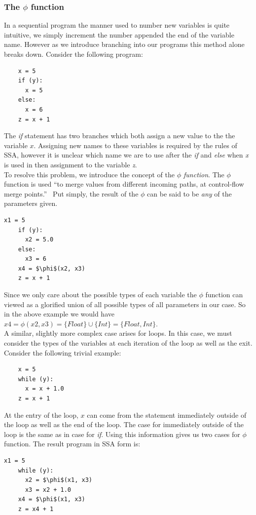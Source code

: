 \documentclass[12pt, titlepage]{article}
\begin{document}
\subsubsection{The $\phi$ function}
In a sequential program the manner used to number new variables is quite intuitive, we simply increment the number appended the end of the variable name. However as we introduce branching into our programs this method alone breaks down. Consider the following program:
\begin{lstlisting}
	x = 5
	if (y):
	  x = 5
	else:
	  x = 6
	z = x + 1
\end{lstlisting}
The \textit{if} statement has two branches which both assign a new value to the the variable $x$. Assigning new names to these variables is required by the rules of SSA, however it is unclear which name we are to use after the \textit{if} and \textit{else} when \textit{x} is used in then assignment to the variable \textit{z}. \\
To resolve this problem, we introduce the concept of the \emph{$\phi$ function}. The $\phi$ function is used ``to merge values from different incoming paths, at control-flow merge points.''~\cite{ssaBook} Put simply, the result of the $\phi$ can be said to be \emph{any} of the parameters given. 
\begin{lstlisting}[mathescape]
	x1 = 5
	if (y):
	  x2 = 5.0
	else:
	  x3 = 6
	x4 = $\phi$(x2, x3)
	z = x + 1
\end{lstlisting}
Since we only care about the possible types of each variable the $\phi$ function can viewed as a glorified union of all possible types of all parameters in our case. So in the above example we would have $x4 = \phi(x2, x3) = \{Float\} \cup \{Int\} = \{Float, Int\}$. \\
A similar, slightly more complex case arises for loops. In this case, we must consider the types of the variables at each iteration of the loop as well as the exit. Consider the following trivial example:
\begin{lstlisting}
	x = 5
	while (y):
	  x = x + 1.0
	z = x + 1
\end{lstlisting}
At the entry of the loop, $x$ can come from the statement immediately outside of the loop as well as the end of the loop. The case for immediately outside of the loop is the same as in case for \textit{if}. Using this information gives us two cases for $\phi$ function. The result program in SSA form is:
\begin{lstlisting}[mathescape]
	x1 = 5
	while (y):
	  x2 = $\phi$(x1, x3)
	  x3 = x2 + 1.0
	x4 = $\phi$(x1, x3)
	z = x4 + 1
\end{lstlisting}
\end{document}
